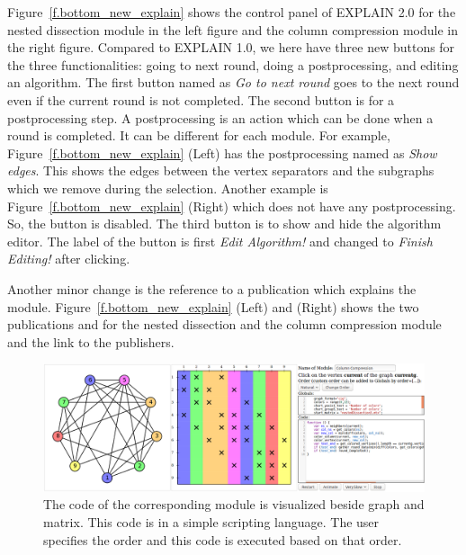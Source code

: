 \documentclass[12pt, twoside,a4paper,toc=bibliography]{scrbook}
\begin{document}
Figure~\ref{f.bottom_new_explain} shows the control panel of EXPLAIN 2.0 for the
nested dissection module in the left figure and the column compression
module in the right figure.
Compared to EXPLAIN 1.0, we here have three new buttons for the three functionalities:
going to next round, doing a postprocessing, and editing an algorithm.
The first button named as \textit{Go to next round} goes to the next round even if
the current round is not completed. The second button is for a postprocessing
step. A postprocessing is an action which can be done when a round is completed.
It can be different for each module.
For example, Figure~\ref{f.bottom_new_explain} (Left) has the postprocessing named
as \textit{Show edges}. This shows the edges between the vertex separators
and the subgraphs which we remove during the selection.
Another example is Figure~\ref{f.bottom_new_explain} (Right) which does not have
any postprocessing. So, the button is disabled.
The third button is to show and hide the algorithm editor.
The label of the button is first \textit{Edit Algorithm!}
and changed to \textit{Finish Editing!} after clicking.

Another minor change is the reference to a publication which explains the
module. Figure~\ref{f.bottom_new_explain} (Left) and (Right) shows the two publications
\cite{2013:05} and \cite{2014:02} for the nested dissection and the column compression module
and the link to the publishers.
\begin{figure}
\centering
\includegraphics[width=\textwidth]{custom_module}
\caption{The code of the corresponding module is visualized beside
graph and matrix. This code is in a simple scripting language.
The user specifies the order and this code is executed based on that order.}
\label{f.custom_module}
\end{figure}
\end{document}

